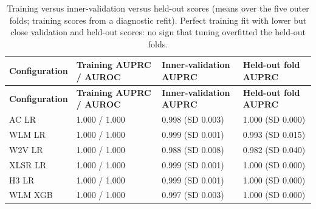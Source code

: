 \documentclass[10pt,a4paper]{article}
\begin{document}
\begin{center}\scriptsize\renewcommand{\arraystretch}{1.12}
\begin{longtable}{llll}
\caption{Training versus inner-validation versus held-out scores (means over the five outer folds; training scores from a diagnostic refit). Perfect training fit with lower but close validation and held-out scores: no sign that tuning overfitted the held-out folds.}\\
\toprule
\textbf{Configuration} & \textbf{Training AUPRC / AUROC} & \textbf{Inner-validation AUPRC} & \textbf{Held-out fold AUPRC}\\\midrule\endfirsthead
\toprule
\textbf{Configuration} & \textbf{Training AUPRC / AUROC} & \textbf{Inner-validation AUPRC} & \textbf{Held-out fold AUPRC}\\\midrule\endhead
\bottomrule\endfoot
AC LR & 1.000 / 1.000 & 0.998 (SD 0.003) & 1.000 (SD 0.000)\\
WLM LR & 1.000 / 1.000 & 0.999 (SD 0.001) & 0.993 (SD 0.015)\\
W2V LR & 1.000 / 1.000 & 0.988 (SD 0.008) & 0.982 (SD 0.040)\\
XLSR LR & 1.000 / 1.000 & 0.999 (SD 0.001) & 1.000 (SD 0.000)\\
H3 LR & 1.000 / 1.000 & 0.999 (SD 0.001) & 1.000 (SD 0.000)\\
WLM XGB & 1.000 / 1.000 & 0.997 (SD 0.003) & 1.000 (SD 0.000)\\
\end{longtable}\end{center}
\end{document}
